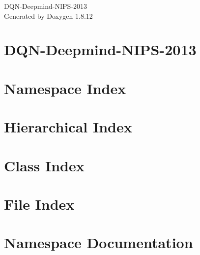 \documentclass[twoside]{book}
\newcommand{\+}{\discretionary{\mbox{\scriptsize$\hookleftarrow$}}{}{}}
\newcommand{\clearemptydoublepage}{%
  \newpage{\pagestyle{empty}\cleardoublepage}%
}
\begin{document}
\hypersetup{pageanchor=false,
             bookmarksnumbered=true,
             pdfencoding=unicode
            }
\begin{titlepage}
\vspace*{7cm}
\begin{center}%
{\Large D\+Q\+N-\/\+Deepmind-\/\+N\+I\+P\+S-\/2013 }\\
\vspace*{1cm}
{\large Generated by Doxygen 1.8.12}\\
\end{center}
\end{titlepage}
\clearemptydoublepage
{}
\tableofcontents
\clearemptydoublepage
{}
\hypersetup{pageanchor=true}

\chapter{D\+Q\+N-\/\+Deepmind-\/\+N\+I\+P\+S-\/2013}
\label{md_README}
\hypertarget{md_README}{}

\chapter{Namespace Index}

\chapter{Hierarchical Index}

\chapter{Class Index}

\chapter{File Index}

\chapter{Namespace Documentation}













\end{document}
